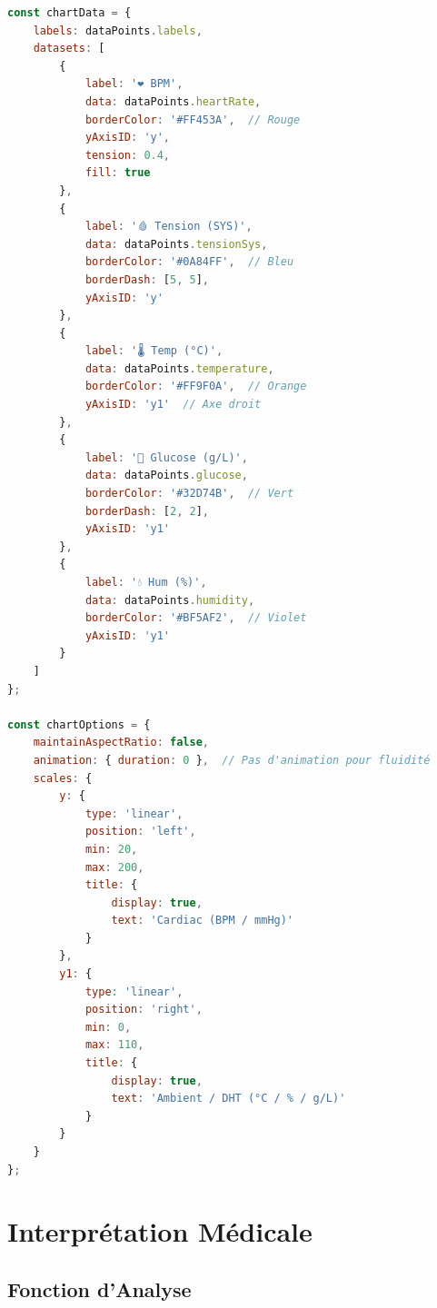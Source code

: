 \documentclass[12pt,french]{report}
\begin{document}
\begin{lstlisting}[language=JavaScript, caption=Configuration graphique]
const chartData = {
    labels: dataPoints.labels,
    datasets: [
        {
            label: '❤️ BPM',
            data: dataPoints.heartRate,
            borderColor: '#FF453A',  // Rouge
            yAxisID: 'y',
            tension: 0.4,
            fill: true
        },
        {
            label: '🩸 Tension (SYS)',
            data: dataPoints.tensionSys,
            borderColor: '#0A84FF',  // Bleu
            borderDash: [5, 5],
            yAxisID: 'y'
        },
        {
            label: '🌡️ Temp (°C)',
            data: dataPoints.temperature,
            borderColor: '#FF9F0A',  // Orange
            yAxisID: 'y1'  // Axe droit
        },
        {
            label: '🍬 Glucose (g/L)',
            data: dataPoints.glucose,
            borderColor: '#32D74B',  // Vert
            borderDash: [2, 2],
            yAxisID: 'y1'
        },
        {
            label: '💧 Hum (%)',
            data: dataPoints.humidity,
            borderColor: '#BF5AF2',  // Violet
            yAxisID: 'y1'
        }
    ]
};

const chartOptions = {
    maintainAspectRatio: false,
    animation: { duration: 0 },  // Pas d'animation pour fluidité
    scales: {
        y: {
            type: 'linear',
            position: 'left',
            min: 20,
            max: 200,
            title: { 
                display: true, 
                text: 'Cardiac (BPM / mmHg)' 
            }
        },
        y1: {
            type: 'linear',
            position: 'right',
            min: 0,
            max: 110,
            title: { 
                display: true, 
                text: 'Ambient / DHT (°C / % / g/L)' 
            }
        }
    }
};
\end{lstlisting}

\section{Interprétation Médicale}

\subsection{Fonction d'Analyse}
\end{document}

